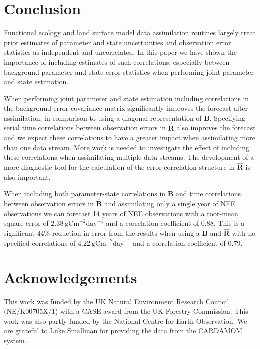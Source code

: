 \documentclass[review]{elsarticle}
\begin{document}
\section{Conclusion}

Functional ecology and land surface model data assimilation routines largely treat prior estimates of parameter and state uncertainties and observation error statistics as independent and uncorrelated. In this paper we have shown the importance of including estimates of such correlations, especially between background parameter and state error statistics when performing joint parameter and state estimation.

When performing joint parameter and state estimation including correlations in the background error covariance matrix significantly improves the forecast after assimilation, in comparison to using a diagonal representation of $\textbf{B}$. Specifying serial time correlations between observation errors in $\hat{\textbf{R}}$ also improves the forecast and we expect these correlations to have a greater impact when assimilating more than one data stream. More work is needed to investigate the effect of including these correlations when assimilating multiple data streams. The development of a more diagnostic tool for the calculation of the error correlation structure in $\hat{\textbf{R}}$ is also important.  

When including both parameter-state correlations in $\textbf{B}$ and time correlations between observation errors in $\hat{\textbf{R}}$ and assimilating only a single year of NEE observations we can forecast 14 years of NEE observations with a root-mean square error of $2.38~\text{gCm}^{-2}\text{day}^{-1}$ and a correlation coefficient of $0.88$. This is a significant $44\%$ reduction in error from the results when using a $\textbf{B}$ and $\hat{\textbf{R}}$ with no specified correlations of $4.22~\text{gCm}^{-2}\text{day}^{-1}$ and a correlation coefficient of $0.79$.

\section{Acknowledgements}

This work was funded by the UK Natural Environment Research Council (NE/K00705X/1) with a CASE award from the UK Forestry Commission. This work was also partly funded by the National Centre for Earth Observation. We are grateful to Luke Smallman for providing the data from the CARDAMOM system.
\end{document}
